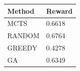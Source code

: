 \begin{tabular}{ll}
\hline
Method & Reward \\
\hline
  MCTS & 0.6618 \\
  RANDOM & 0.6764 \\
  GREEDY & 0.4278 \\
  GA & 0.6349 \\
\hline
\end{tabular}
